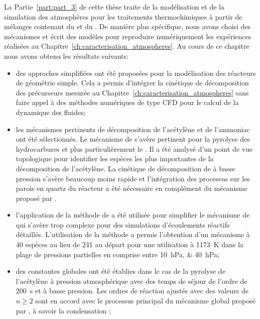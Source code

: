 La Partie~\ref{part:part_3} de cette thèse traite de la modélisation et de la simulation des atmosphères pour les traitements thermochimiques à partir de mélanges contenant du  et du . De manière plus spécifique, nous avons choisi des mécanismes et écrit des modèles pour reproduire numériquement les expériences réalisées au Chapitre~\ref{ch:caracterisation_atmospheres}. Au cours de ce chapitre nous avons obtenu les résultats suivants:
\begin{itemize}
  \item des approches simplifiées ont été proposées pour la modélisation des réacteurs de géométrie simple. Cela a permis d'intégrer la cinétique de décomposition des précurseurs mesurée au Chapitre~\ref{ch:caracterisation_atmospheres} sans faire appel à des méthodes numériques de type CFD pour le calcul de la dynamique des fluides;
  
  \item les mécanismes pertinents de décomposition de l'acétylène et de l'ammoniac ont été sélectionnés. Le mécanisme de \citet{Norinaga2009} s'avère pertinent pour la pyrolyse des hydrocarbures  et plus particulièrement le . Il a été analysé d'un point de vue topologique pour identifier les espèces les plus importantes de la décomposition de l'acétylène. La cinétique de décomposition de  à basse pression s'avère beaucoup moins rapide et l'intégration des processus sur les parois en quartz du réacteur a été nécessaire en complément du mécanisme proposé par \citet{Dirtu2006}.
  
  \item l'application de la méthode de \citet{Lu2005} a été utilisée pour simplifier le mécanisme de \citet{Norinaga2009} qui s'avère trop complexe pour des simulations d'écoulements réactifs détaillés. L'utilisation de la méthode a permis l'obtention d'un mécanisme à 40 espèces \textendash{} au lieu de 241 au départ \textendash{} pour une utilisation à \SI{1173}{\kelvin} dans la plage de pressions partielles en  comprise entre \SIlist{10;40}{\hecto\pascal};
  
  \item des constantes globales ont été établies dans le cas de la pyrolyse de l'acétylène à pression atmosphérique avec des temps de séjour de l'ordre de \SI{200}{\second} et à basse pression. Les ordres de réaction ajustés avec des valeurs de $n\geq{}2$ sont en accord avec le processus principal du mécanisme global proposé par \citet{Norinaga2005}, à savoir la condensation ; 
  

\end{itemize}
